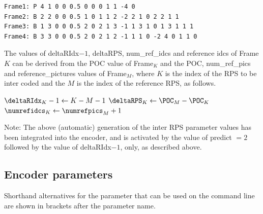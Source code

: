 \documentclass[a4paper,11pt]{jvetdoc}
\begin{document}
\begin{verbatim}
Frame1: P 4 1 0 0 0.5 0 0 0 1 1 -4 0
Frame2: B 2 2 0 0 0.5 1 0 1 1 2 -2 2 1 0 2 2 1 1
Frame3: B 1 3 0 0 0.5 2 0 2 1 3 -1 1 3 1 0 1 3 1 1 1
Frame4: B 3 3 0 0 0.5 2 0 2 1 2 -1 1 1 0 -2 4 0 1 1 0
\end{verbatim}

The values of deltaRIdx$-1$, deltaRPS, num_ref_idcs and reference
idcs of Frame$K$ can be derived from the POC value of Frame$_K$ and
the POC, num_ref_pics and reference_pictures values of Frame$_M$, where
$K$ is the index of the RPS to be inter coded and the $M$ is the
index of the reference RPS, as follows.

\setlength{\algomargin}{2em}
\begin{algorithm}[ht]

$\deltaRIdx_K - 1  \leftarrow  K - M - 1$ \;
$\deltaRPS_K       \leftarrow  \POC_M - \POC_K$ \;
$\numrefidcs_K     \leftarrow  \numrefpics_M + 1$ \;


\end{algorithm}

Note: The above (automatic) generation of the inter RPS parameter
values has been integrated into the encoder, and is activated by
the value of predict $= 2$ followed by the value of deltaRIdx$-1$,
only, as described above.



\subsection{Encoder parameters}

Shorthand alternatives for the parameter that can be used on the command line are shown in brackets after the parameter name.
\end{document}
